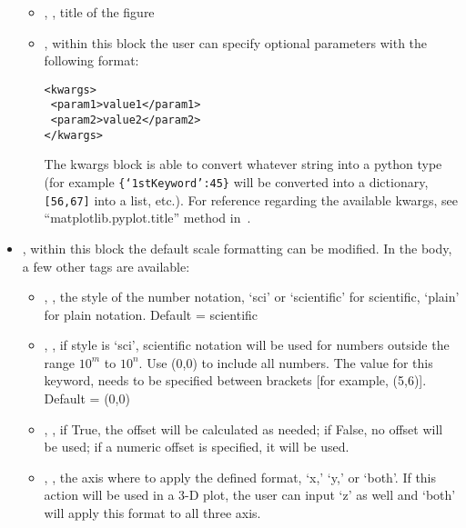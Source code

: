\begin{itemize}
  \begin{itemize}
    \item {}, , title of the figure
    \item {}, within this block the user can specify optional parameters
    with the following format:

\begin{lstlisting}[style=XML]
<kwargs>
 <param1>value1</param1>
 <param2>value2</param2>
</kwargs>
\end{lstlisting}

    The kwargs block is able to convert whatever string into a python type (for
    example \texttt{\{`1stKeyword':45\}} will
    be converted into a dictionary, 
    \texttt{[56,67]} into a list, etc.).
    For reference regarding the available kwargs, see
    ``matplotlib.pyplot.title'' method in~\cite{MatPlotLib}.
  \end{itemize}
  \item {}, within this block the default scale formatting
  can be modified.
  In the body, a few other tags are available:
 \begin{itemize}
    \item {}, , the style of the number notation,
    `sci' or `scientific' for scientific, `plain' for plain notation.
    Default = scientific
    \item {}, , if
    style is `sci', scientific notation will be used for numbers outside the
    range $10^m$ to $10^n$.
    Use (0,0) to include all numbers.
    \nb The value for this keyword, needs to be specified between brackets [for
    example, (5,6)].
    Default = (0,0)
    \item {}, , if True, the offset
    will be calculated as needed; if False, no offset will be used; if a numeric
    offset is specified, it will be used.
    \item {}, , the axis where to apply the defined
    format, `x,' `y,' or `both'.
    \nb If this action will be used in a 3-D plot, the user can input `z' as
    well and `both' will apply this format to all three axis.
  \end{itemize}

\end{itemize}
